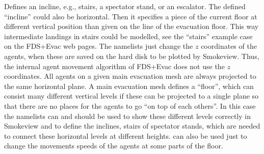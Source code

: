 \documentclass[12pt,a4paper,final,twoside]{stylevk}
\begin{document}
\noindent Defines an incline, e.g., stairs, a spectator stand,
or an escalator.  The defined ``incline'' could also be horizontal.
Then it specifies a piece of the current floor at different vertical
position than given on the  line of the evacuation floor.
This way intermediate landings in stairs could be modelled, see the
``stairs'' example case on the FDS+Evac web pages.  The 
namelists just change the $z$ coordinates of the agents, when these
are saved on the hard disk to be plotted by Smokeview.  Thus, the
internal agent movement algorithm of FDS+Evac does not use the $z$
coordinates.  All agents on a given main evacuation mesh are always
projected to the same horizontal plane.  A main evacuation mesh
defines a ``floor'', which can consist many different vertical levels
if these can be projected to a single plane so that there are no
places for the agents to go ``on top of each others''.  In this case
the  namelists can and should be used to show these
different levels correctly in Smokeview and to define the inclines,
stairs of spectator stands, which are needed to connect these
horizontal levels at different heights.   can also be used
just to change the movements speeds of the agents at some parts of the
floor.
\end{document}
